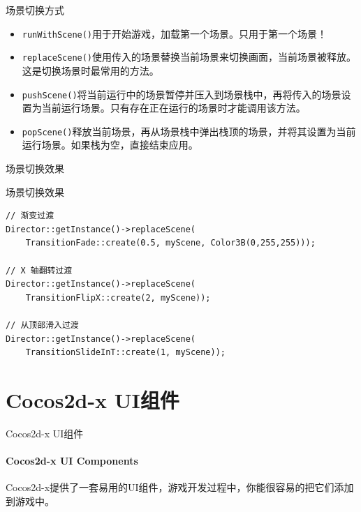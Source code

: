 \documentclass{beamer}
\begin{document}

\begin{frame}[fragile]{场景切换方式}
\begin{itemize}
\item \texttt{runWithScene()}用于开始游戏，加载第一个场景。只用于第一个场景！
\item \texttt{replaceScene()}使用传入的场景替换当前场景来切换画面，当前场景被释放。这是切换场景时最常用的方法。
\item \texttt{pushScene()}将当前运行中的场景暂停并压入到场景栈中，再将传入的场景设置为当前运行场景。只有存在正在运行的场景时才能调用该方法。
\item \texttt{popScene()}释放当前场景，再从场景栈中弹出栈顶的场景，并将其设置为当前运行场景。如果栈为空，直接结束应用。
\end{itemize}
\end{frame}


\begin{frame}[fragile]{场景切换效果}
\begin{block}{场景切换效果}
\begin{verbatim}
// 渐变过渡
Director::getInstance()->replaceScene(
    TransitionFade::create(0.5, myScene, Color3B(0,255,255)));

// X 轴翻转过渡
Director::getInstance()->replaceScene(
    TransitionFlipX::create(2, myScene));

// 从顶部滑入过渡
Director::getInstance()->replaceScene(
    TransitionSlideInT::create(1, myScene));
\end{verbatim}
\end{block}
\end{frame}


\section{Cocos2d-x UI组件}


\begin{chapter}{}{Cocos2d-x UI组件}
\framesubtitle{Cocos2d-x UI Components}
Cocos2d-x提供了一套易用的UI组件，游戏开发过程中，你能很容易的把它们添加到游戏中。
\end{chapter}

\end{document}
